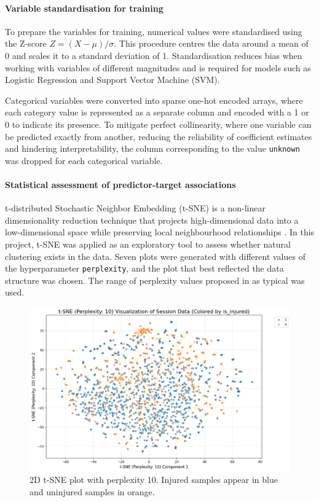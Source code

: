 \paragraph{Variable standardisation for training}
To prepare the variables for training, numerical values were standardised using the Z-score $Z = (X - \mu) / \sigma$. This procedure centres the data around a mean of 0 and scales it to a standard deviation of 1. Standardisation reduces bias when working with variables of different magnitudes and is required for models such as Logistic Regression and Support Vector Machine (SVM).

Categorical variables were converted into sparse one-hot encoded arrays, where each category value is represented as a separate column and encoded with a 1 or 0 to indicate its presence. To mitigate perfect collinearity, where one variable can be predicted exactly from another, reducing the reliability of coefficient estimates and hindering interpretability, the column corresponding to the value \texttt{unknown} was dropped for each categorical variable.


\paragraph{Statistical assessment of predictor-target associations}
t-distributed Stochastic Neighbor Embedding (t-SNE) is a non-linear dimensionality reduction technique that projects high-dimensional data into a low-dimensional space while preserving local neighbourhood relationships \citep{JMLR:v9:vandermaaten08a}. In this project, t-SNE was applied as an exploratory tool to assess whether natural clustering exists in the data. Seven plots were generated with different values of the hyperparameter \texttt{perplexity}, and the plot that best reflected the data structure was chosen. The range of perplexity values proposed in \citet{JMLR:v9:vandermaaten08a} as typical was used.

\begin{figure}[ht]
    \centering
    \includegraphics[width=0.5\columnwidth]{images/t-sne-p10-scatter-is_injured.png}
    \caption[2D t-SNE plot with perplexity 10]{2D t-SNE plot with perplexity 10. Injured samples appear in blue and uninjured samples in orange.\label{fig:met-tsne-injured}}
\end{figure}

